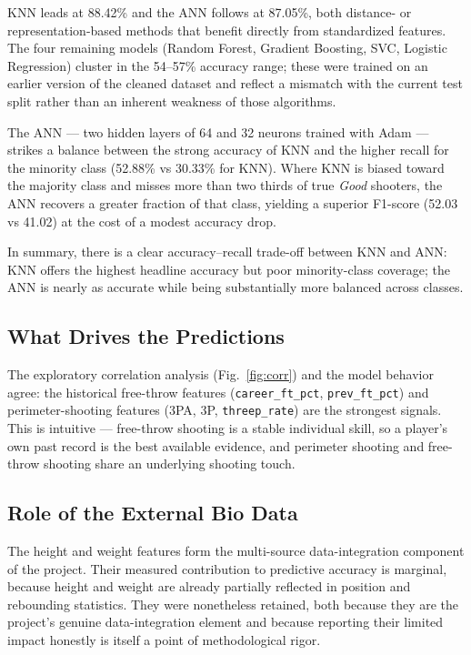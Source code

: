 \documentclass[conference]{IEEEtran}
\begin{document}
KNN leads at 88.42\% and the ANN follows at 87.05\%, both distance- or representation-based methods that benefit directly from standardized features. The four remaining models (Random Forest, Gradient Boosting, SVC, Logistic Regression) cluster in the 54--57\% accuracy range; these were trained on an earlier version of the cleaned dataset and reflect a mismatch with the current test split rather than an inherent weakness of those algorithms.

The ANN --- two hidden layers of 64 and 32 neurons trained with Adam --- strikes a balance between the strong accuracy of KNN and the higher recall for the minority class (52.88\% vs 30.33\% for KNN). Where KNN is biased toward the majority class and misses more than two thirds of true \textit{Good} shooters, the ANN recovers a greater fraction of that class, yielding a superior F1-score (52.03 vs 41.02) at the cost of a modest accuracy drop.

In summary, there is a clear accuracy--recall trade-off between KNN and ANN: KNN offers the highest headline accuracy but poor minority-class coverage; the ANN is nearly as accurate while being substantially more balanced across classes.

\subsection{What Drives the Predictions}

The exploratory correlation analysis (Fig.~\ref{fig:corr}) and the model behavior agree: the historical free-throw features (\texttt{career\_ft\_pct}, \texttt{prev\_ft\_pct}) and perimeter-shooting features (3PA, 3P, \texttt{threep\_rate}) are the strongest signals. This is intuitive --- free-throw shooting is a stable individual skill, so a player's own past record is the best available evidence, and perimeter shooting and free-throw shooting share an underlying shooting touch.

\subsection{Role of the External Bio Data}

The height and weight features form the multi-source data-integration component of the project. Their measured contribution to predictive accuracy is marginal, because height and weight are already partially reflected in position and rebounding statistics. They were nonetheless retained, both because they are the project's genuine data-integration element and because reporting their limited impact honestly is itself a point of methodological rigor.
\end{document}
